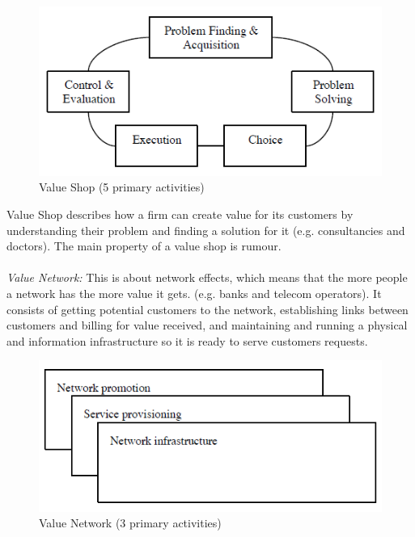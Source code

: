 \begin{figure}
\begin{center}
\includegraphics[scale=0.8]{valueshopnew}
\caption[Value Shop]{Value Shop (5 primary activities) \cite{osterwalderthesis}}
\label{fig:ValueShop}
\end{center}
\end{figure}
Value Shop describes how a firm can create value for its customers by understanding their problem and finding a solution for it (e.g. consultancies and doctors). The main property of a value shop is rumour.  \\ \\
\emph{Value Network:}
This is about network effects, which means that the more people a network has the more value it gets. (e.g. banks and telecom operators). It consists of getting potential customers to the network, establishing links between customers and billing for value received, and maintaining and running a physical and information infrastructure so it is ready to serve customers requests. 
\begin{figure}
\begin{center}
\includegraphics[scale=0.7]{valuenetworknew}
\caption[Value Network]{Value Network (3 primary activities) \cite{osterwalderthesis}}
\label{fig:ValueNetwork}
\end{center}
\end{figure}


